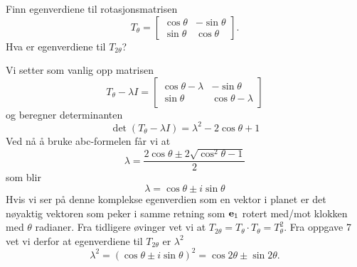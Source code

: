 \begin{oppgave}
Finn egenverdiene til rotasjonsmatrisen
\[
T_{\theta}=
\begin{bmatrix}
\cos \theta & -\sin \theta  \\ \sin \theta & \cos \theta  
\end{bmatrix}.
\]
Hva er egenverdiene til $T_{2 \theta}$?
\end{oppgave}


\begin{losning}
Vi setter som vanlig opp matrisen
\begin{equation*}
	T_\theta - \lambda I = 
	\begin{bmatrix}
	\cos \theta - \lambda & -\sin\theta \\
	\sin\theta & \cos\theta - \lambda
\end{bmatrix}
\end{equation*}
og beregner determinanten
\begin{equation*}
	\det(T_\theta - \lambda I) = \lambda^2 - 2\cos\theta + 1
\end{equation*}
Ved nå å bruke abc-formelen får vi at 
\begin{equation*}
	\lambda = \frac{2\cos\theta \pm 2\sqrt{\cos ^2\theta - 1}}{2}
\end{equation*}	
som blir
\begin{equation*}
	\lambda = \cos\theta \pm i\sin\theta
\end{equation*}
Hvis vi ser på denne komplekse egenverdien som en vektor i planet er det nøyaktig vektoren som peker i samme retning som $\mathbf{e}_1$ rotert med/mot klokken med $\theta$ radianer. Fra tidligere øvinger vet vi at $T_{2\theta} = T_\theta\cdot T_\theta = T_\theta^2$. Fra oppgave 7 vet vi derfor at egenverdiene til  $T_{2\theta}$ er $\lambda^2$
\begin{equation*}
	\lambda^2 = (\cos\theta \pm i\sin\theta)^2 =  \cos 2\theta \pm \sin2\theta.
\end{equation*}
\end{losning}


